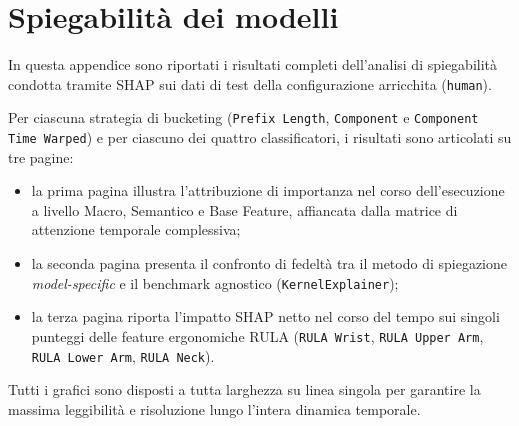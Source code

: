 \chapter{Spiegabilit\`a dei modelli}
\label{app:xai_complete_review}

In questa appendice sono riportati i risultati completi dell'analisi di spiegabilit\`a condotta tramite SHAP sui dati di test della configurazione arricchita (\texttt{human}).

Per ciascuna strategia di bucketing (\texttt{Prefix Length}, \texttt{Component} e \texttt{Component Time Warped}) e per ciascuno dei quattro classificatori, i risultati sono articolati su tre pagine:
\begin{itemize}
    \item la prima pagina illustra l'attribuzione di importanza nel corso dell'esecuzione a livello Macro, Semantico e Base Feature, affiancata dalla matrice di attenzione temporale complessiva;
    \item la seconda pagina presenta il confronto di fedelt\`a tra il metodo di spiegazione \textit{model-specific} e il benchmark agnostico (\texttt{KernelExplainer});
    \item la terza pagina riporta l'impatto SHAP netto nel corso del tempo sui singoli punteggi delle feature ergonomiche RULA (\texttt{RULA Wrist}, \texttt{RULA Upper Arm}, \texttt{RULA Lower Arm}, \texttt{RULA Neck}).
\end{itemize}
Tutti i grafici sono disposti a tutta larghezza su linea singola per garantire la massima leggibilit\`a e risoluzione lungo l'intera dinamica temporale.

\clearpage

